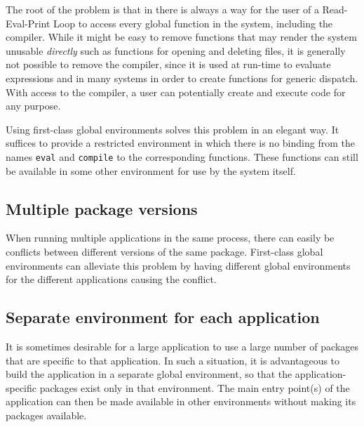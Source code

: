 The root of the problem is that in \commonlisp{} there is always a way
for the user of a Read-Eval-Print Loop to access every global function
in the system, including the compiler.  While it might be easy to
remove functions that may render the system unusable \emph{directly}
such as functions for opening and deleting files, it is generally not
possible to remove the compiler, since it is used at run-time to
evaluate expressions and in many systems in order to create functions
for generic dispatch.  With access to the compiler, a user can
potentially create and execute code for any purpose.

Using first-class global environments solves this problem in an
elegant way.  It suffices to provide a restricted environment in which
there is no binding from the names \texttt{eval} and \texttt{compile}
to the corresponding functions.  These functions can still be
available in some other environment for use by the system itself.

\subsection{Multiple package versions}

When running multiple applications in the same \commonlisp{} process,
there can easily be conflicts between different versions of the same
package.  First-class global environments can alleviate this problem
by having different global environments for the different applications
causing the conflict.%

\subsection{Separate environment for each application}

It is sometimes desirable for a large application to use a large
number of packages that are specific to that application.  In such a
situation, it is advantageous to build the application in a separate
global environment, so that the application-specific packages exist
only in that environment.  The main entry point(s) of the application
can then be made available in other environments without making its
packages available.%

